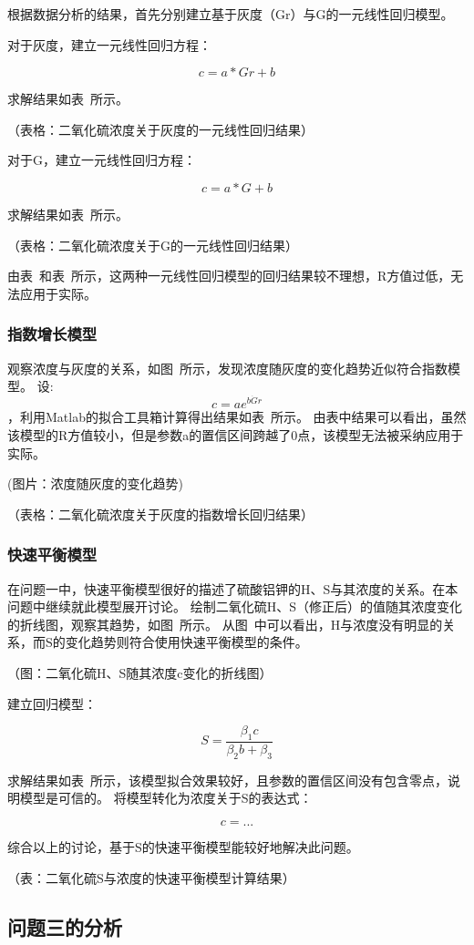 根据数据分析的结果，首先分别建立基于灰度（Gr）与G的一元线性回归模型。

对于灰度，建立一元线性回归方程：

$$c=a*Gr+b$$

求解结果如表~所示。

（表格：二氧化硫浓度关于灰度的一元线性回归结果）

对于G，建立一元线性回归方程：

$$c=a*G+b$$

求解结果如表~所示。

（表格：二氧化硫浓度关于G的一元线性回归结果）

由表~和表~所示，这两种一元线性回归模型的回归结果较不理想，R方值过低，无法应用于实际。

\subsubsection{指数增长模型}

观察浓度与灰度的关系，如图~所示，发现浓度随灰度的变化趋势近似符合指数模型。
设: $$c=ae^{b\dot Gr}$$，利用Matlab的拟合工具箱计算得出结果如表~所示。
由表中结果可以看出，虽然该模型的R方值较小，但是参数a的置信区间跨越了0点，该模型无法被采纳应用于实际。

(图片：浓度随灰度的变化趋势)

（表格：二氧化硫浓度关于灰度的指数增长回归结果）



\subsubsection{快速平衡模型}

在问题一中，快速平衡模型很好的描述了硫酸铝钾的H、S与其浓度的关系。在本问题中继续就此模型展开讨论。
绘制二氧化硫H、S（修正后）的值随其浓度变化的折线图，观察其趋势，如图~所示。
从图~中可以看出，H与浓度没有明显的关系，而S的变化趋势则符合使用快速平衡模型的条件。

（图：二氧化硫H、S随其浓度c变化的折线图）

建立回归模型：


   $$ S = \frac{\beta_1 c}{\beta_2b+\beta_3}$$


求解结果如表~所示，该模型拟合效果较好，且参数的置信区间没有包含零点，说明模型是可信的。
将模型转化为浓度关于S的表达式：


    $$c = ...$$


综合以上的讨论，基于S的快速平衡模型能较好地解决此问题。

（表：二氧化硫S与浓度的快速平衡模型计算结果）


\subsection{问题三的分析}
